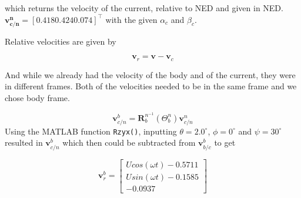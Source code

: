 which returns the velocity of the current, relative to NED and given in NED. $\mathbf{v^n_{c/n}} = [0.418 0.424 0.074]^\top$ with the given $\alpha_c$ and $\beta_c$. 

Relative velocities are given by

\begin{equation}
    \boldsymbol{v}_r = \boldsymbol{v} - \boldsymbol{v}_c
    \label{eq_v_r}
\end{equation}

And while we already had the velocity of the body and of the current, they were in different frames. Both of the velocities needed to be in the same frame and we chose body frame.

\begin{equation}
    \mathbf{v}^b_{c/n} = \mathbf{R}_b^{n^{-1}}(\Theta^n_b)\mathbf{v}_{c/n}^n
\end{equation}
Using the MATLAB function \texttt{Rzyx()}, inputting $\theta = 2.0^\circ$, $\phi = 0^\circ$ and $\psi = 30^\circ$ resulted in $\mathbf{v}_{c/n}^b$ which then could be subtracted from $\mathbf{v}_{b/c}^b$ to get

\begin{equation}
    \boldsymbol{v}_r^b = 
    \begin{bmatrix}
        U cos(\omega t) - 0.5711 \\
        U sin(\omega t) - 0.1585 \\
        - 0.0937
    \end{bmatrix}
\end{equation}

